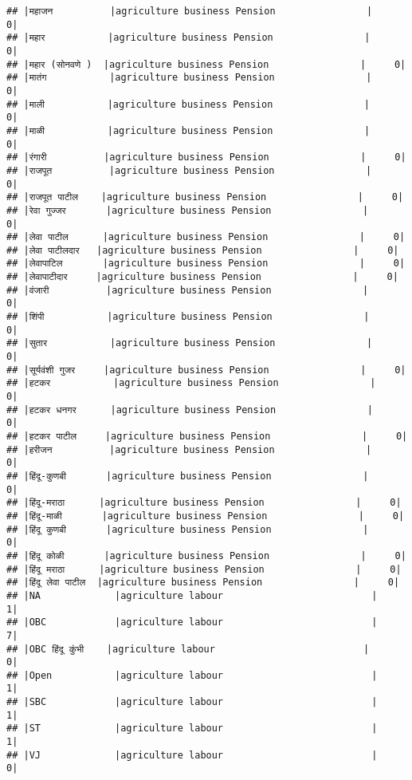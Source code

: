 \documentclass[
]{article}
\begin{document}
\begin{verbatim}
## |महाजन          |agriculture business Pension                |     0|
## |महार           |agriculture business Pension                |     0|
## |महार (सोनवणे )  |agriculture business Pension                |     0|
## |मातंग           |agriculture business Pension                |     0|
## |माली           |agriculture business Pension                |     0|
## |माळी           |agriculture business Pension                |     0|
## |रंगारी          |agriculture business Pension                |     0|
## |राजपूत          |agriculture business Pension                |     0|
## |राजपूत पाटील    |agriculture business Pension                |     0|
## |रेवा गुज्जर       |agriculture business Pension                |     0|
## |लेवा पाटील      |agriculture business Pension                |     0|
## |लेवा पाटीलदार   |agriculture business Pension                |     0|
## |लेवापाटिल       |agriculture business Pension                |     0|
## |लेवापाटीदार     |agriculture business Pension                |     0|
## |वंजारी          |agriculture business Pension                |     0|
## |शिंपी           |agriculture business Pension                |     0|
## |सुतार           |agriculture business Pension                |     0|
## |सूर्यवंशी गुजर     |agriculture business Pension                |     0|
## |हटकर           |agriculture business Pension                |     0|
## |हटकर धनगर      |agriculture business Pension                |     0|
## |हटकर पाटील     |agriculture business Pension                |     0|
## |हरीजन          |agriculture business Pension                |     0|
## |हिंदू-कुणबी       |agriculture business Pension                |     0|
## |हिंदू-मराठा      |agriculture business Pension                |     0|
## |हिंदू-माळी       |agriculture business Pension                |     0|
## |हिंदू कुणबी       |agriculture business Pension                |     0|
## |हिंदू कोळी       |agriculture business Pension                |     0|
## |हिंदू मराठा      |agriculture business Pension                |     0|
## |हिंदू लेवा पाटील  |agriculture business Pension                |     0|
## |NA             |agriculture labour                          |     1|
## |OBC            |agriculture labour                          |     7|
## |OBC हिंदू कुंभी    |agriculture labour                          |     0|
## |Open           |agriculture labour                          |     1|
## |SBC            |agriculture labour                          |     1|
## |ST             |agriculture labour                          |     1|
## |VJ             |agriculture labour                          |     0|

\end{verbatim}
\end{document}
